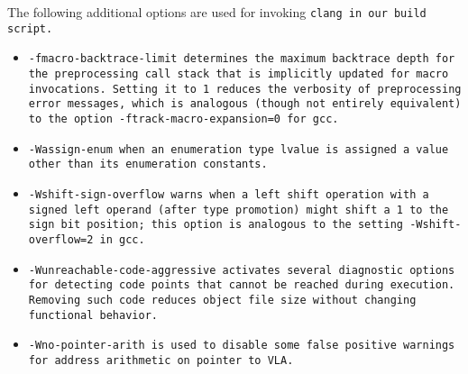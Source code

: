 The following additional options are used
for invoking \tt{clang} in our build script.

\begin{itemize}

\item \tt{-fmacro-backtrace-limit} determines the maximum backtrace depth for
the preprocessing call stack that is implicitly updated for macro invocations.
Setting it to \tt{1} reduces the verbosity of preprocessing error messages,
which is analogous (though not entirely equivalent) to
the option \tt{-ftrack-macro-expansion=0} for \tt{gcc}.

\item \tt{-Wassign-enum} when an enumeration type lvalue
is assigned a value other than its enumeration constants.

\item \tt{-Wshift-sign-overflow} warns when a left shift operation with a signed
left operand (after type promotion) might shift a \tt{1} to the sign bit position;
this option is analogous to the setting \tt{-Wshift-overflow=2} in \tt{gcc}.

\item \tt{-Wunreachable-code-aggressive} activates several diagnostic
options for detecting code points that cannot be reached during execution.
Removing such code reduces object file size without changing functional behavior.

\item \tt{-Wno-pointer-arith} is used to disable some false
positive warnings for address arithmetic on pointer to VLA.

\end{itemize}
